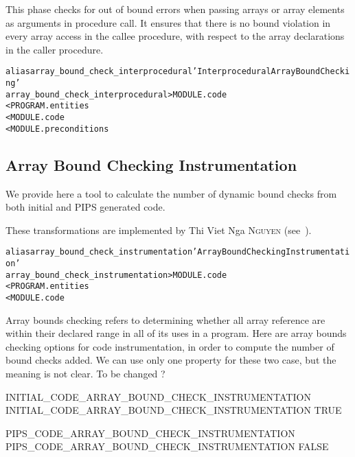 \documentclass[a4paper]{report}
\newenvironment{PipsMake}{\begin{alltt}}{\end{alltt}}
\newenvironment{PipsPass}[1]{\label{pass:#1}}{}
\begin{document}
\begin{PipsPass}{array_bound_check_interprocedural}
This phase checks for out of bound errors when passing arrays or array
elements as arguments in procedure call. It ensures that there is no bound
violation in every array access in the callee procedure, with respect to
the array declarations in the caller procedure.
\end{PipsPass}

\begin{PipsMake}
alias array_bound_check_interprocedural 'Interprocedural Array Bound Checking'
array_bound_check_interprocedural             > MODULE.code
        < PROGRAM.entities
        < MODULE.code
        < MODULE.preconditions
\end{PipsMake}



\subsection{Array Bound Checking Instrumentation}
\label{subsection-array-bound-check_instrumentation}

\begin{PipsPass}{array_bound_check_instrumentation}

We provide here a tool to calculate the number of dynamic bound checks
from both initial and PIPS generated code.

These transformations are implemented by Thi Viet Nga \textsc{Nguyen} (see~\cite{Ngu02}).
\end{PipsPass}

\begin{PipsMake}
alias array_bound_check_instrumentation 'Array Bound Checking Instrumentation'
array_bound_check_instrumentation > MODULE.code
        < PROGRAM.entities
        < MODULE.code
\end{PipsMake}



Array bounds checking refers to determining whether all array reference
are within their declared range in all of its uses in a program. Here are
array bounds checking options for code instrumentation, in order to
compute the number of bound checks added. We can use only one property for
these two case, but the meaning is not clear. To be changed ?

\begin{PipsProp}{INITIAL_CODE_ARRAY_BOUND_CHECK_INSTRUMENTATION}
INITIAL_CODE_ARRAY_BOUND_CHECK_INSTRUMENTATION TRUE
\end{PipsProp}
\begin{PipsProp}{PIPS_CODE_ARRAY_BOUND_CHECK_INSTRUMENTATION}
PIPS_CODE_ARRAY_BOUND_CHECK_INSTRUMENTATION FALSE
\end{PipsProp}
\end{document}
